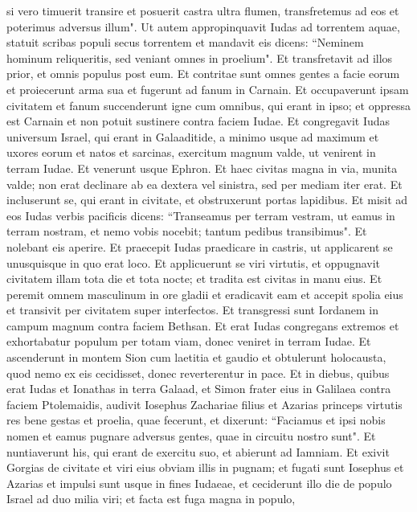 \begin{biblechapter}
\verse si vero timuerit transire et posuerit castra ultra flumen, transfretemus ad eos et poterimus adversus illum". 
\verse Ut autem appropinquavit Iudas ad torrentem aquae, statuit scribas populi secus torrentem et mandavit eis dicens: “Neminem hominum reliqueritis, sed veniant omnes in proelium". 
\verse Et transfretavit ad illos prior, et omnis populus post eum. Et contritae sunt omnes gentes a facie eorum et proiecerunt arma sua et fugerunt ad fanum in Carnain. 
\verse Et occupaverunt ipsam civitatem et fanum succenderunt igne cum omnibus, qui erant in ipso; et oppressa est Carnain et non potuit sustinere contra faciem Iudae. 
\verse Et congregavit Iudas universum Israel, qui erant in Galaaditide, a minimo usque ad maximum et uxores eorum et natos et sarcinas, exercitum magnum valde, ut venirent in terram Iudae. 
\verse Et venerunt usque Ephron. Et haec civitas magna in via, munita valde; non erat declinare ab ea dextera vel sinistra, sed per mediam iter erat. 
\verse Et incluserunt se, qui erant in civitate, et obstruxerunt portas lapidibus. Et misit ad eos Iudas verbis pacificis 
\verse dicens: “Transeamus per terram vestram, ut eamus in terram nostram, et nemo vobis nocebit; tantum pedibus transibimus". Et nolebant eis aperire. 
\verse Et praecepit Iudas praedicare in castris, ut applicarent se unusquisque in quo erat loco. 
\verse Et applicuerunt se viri virtutis, et oppugnavit civitatem illam tota die et tota nocte; et tradita est civitas in manu eius. 
\verse Et peremit omnem masculinum in ore gladii et eradicavit eam et accepit spolia eius et transivit per civitatem super interfectos. 
\verse Et transgressi sunt Iordanem in campum magnum contra faciem Bethsan. 
\verse Et erat Iudas congregans extremos et exhortabatur populum per totam viam, donec veniret in terram Iudae. 
\verse Et ascenderunt in montem Sion cum laetitia et gaudio et obtulerunt holocausta, quod nemo ex eis cecidisset, donec reverterentur in pace. 
\verse Et in diebus, quibus erat Iudas et Ionathas in terra Galaad, et Simon frater eius in Galilaea contra faciem Ptolemaidis, 
\verse audivit Iosephus Zachariae filius et Azarias princeps virtutis res bene gestas et proelia, quae fecerunt,  
\verse et dixerunt: “Faciamus et ipsi nobis nomen et eamus pugnare adversus gentes, quae in circuitu nostro sunt". 
\verse Et nuntiaverunt his, qui erant de exercitu suo, et abierunt ad Iamniam. 
\verse Et exivit Gorgias de civitate et viri eius obviam illis in pugnam; 
\verse et fugati sunt Iosephus et Azarias et impulsi sunt usque in fines Iudaeae, et ceciderunt illo die de populo Israel ad duo milia viri; et facta est fuga magna in populo, 

\end{biblechapter}
